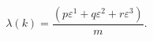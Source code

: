 \begin{equation}
\lambda (k)= \frac{(p\varepsilon^1 +
q \varepsilon^2 + r  \varepsilon^3)}{m}. 
\label{6222}
\end{equation}

